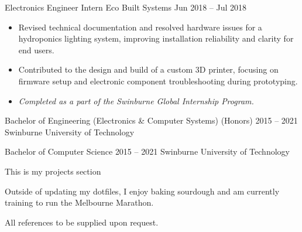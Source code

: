 \documentclass[9pt]{extarticle}
\begin{document}
\begin{minipage}[t]{\textwidth}
	\cvexperience
		{Electronics Engineer Intern}
		{Eco Built Systems}
		{Jun 2018 -- Jul 2018}
		{
			\begin{itemize}[itemsep=0.25em]
				\item Revised technical documentation and resolved hardware issues for a hydroponics lighting system, improving installation reliability and clarity for end users.
				\item Contributed to the design and build of a custom 3D printer, focusing on firmware setup and electronic component troubleshooting during prototyping.
				\item \textit{Completed as a part of the Swinburne Global Internship Program.}
			\end{itemize}
		}
\end{minipage}

\cvbreak


\begin{minipage}[t]{\textwidth}
	\vspace{-\baselineskip}

	\cveducation
		{Bachelor of Engineering (Electronics \& Computer Systems) \normalfont(Honors)}
		{2015 -- 2021}
		{Swinburne University of Technology}

	\cveducation
		{Bachelor of Computer Science}
		{2015 -- 2021}
		{Swinburne University of Technology}
\end{minipage}

\cvbreak


\begin{minipage}[t]{0.3\textwidth}
	\vspace{-\baselineskip}

	This is my projects section
\end{minipage}
\hfill
\begin{minipage}[t]{0.3\textwidth}
	\vspace{-\baselineskip}

	Outside of updating my dotfiles, I enjoy baking sourdough and am currently training to run the Melbourne Marathon.
\end{minipage}
\hfill
\begin{minipage}[t]{0.3\textwidth}
	\vspace{-\baselineskip}

	All references to be supplied upon request.
\end{minipage}
\end{document}
